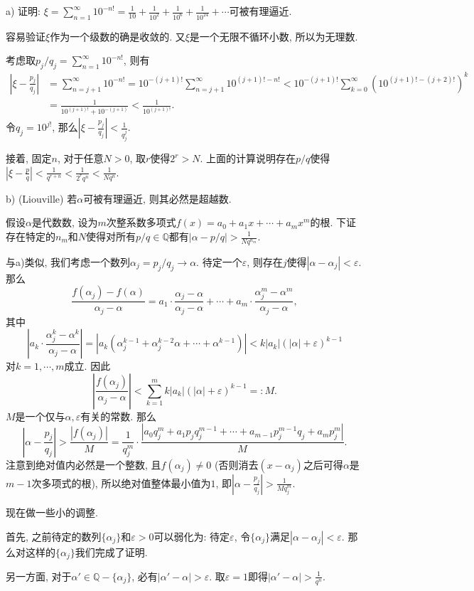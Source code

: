 a) 证明: $\xi = \sum_{n=1}^{\infty} 10^{-n!} = \frac{1}{10} + \frac{1}{10^2} + \frac{1}{10^6}+\frac{1}{10^{24}} + \cdots$可被有理逼近. 

\begin{solution}
	容易验证$\xi$作为一个级数的确是收敛的. 又$\xi$是一个无限不循环小数, 所以为无理数.
	
	考虑取$p_j/q_j = \sum_{n=1}^{\infty} 10^{-n!}$, 则有
	\begin{align*}
		\left| \xi - \frac{p_j}{q_j} \right| &= \sum_{n=j+1}^{\infty} 10^{-n!} = 10^{-(j+1)!} \sum_{n=j+1}^{\infty} 10^{(j+1)!-n!} < 10^{-(j+1)!} \sum_{k=0}^{\infty} \left( 10^{(j+1)!-(j+2)!} \right)^k \\
		&= \frac{1}{10^{(j+1)!} + 10^{-(j+1)}} < \frac{1}{10^{(j+1)!}}.
	\end{align*}
	令$q_j=10^{j!}$, 那么$|\xi - \frac{p_j}{q_j}| < \frac{1}{q_j^j}$. 
	
	接着, 固定$n$, 对于任意$N>0$, 取$r$使得$2^r>N$. 上面的计算说明存在$p/q$使得$|\xi - \frac{p}{q} |< \frac{1}{q^{r+n}} < \frac{1}{2^r q^n} < \frac{1}{Nq^n}$. 
\end{solution}

b) (Liouville) 若$\alpha$可被有理逼近, 则其必然是超越数. 

\begin{solution}
	假设$\alpha$是代数数, 设为$m$次整系数多项式$f(x) = a_0 + a_1x + \cdots + a_mx^m$的根. 下证存在特定的$n_m$和$N$使得对所有$p/q \in \mathbb{Q}$都有$|\alpha - p/q| > \frac{1}{Nq^{n_m}}$. 
	
	与a)类似, 我们考虑一个数列$\alpha _j = p_j/q_j \to \alpha$. 待定一个$\varepsilon$, 则存在$j$使得$|\alpha - \alpha _j |<\varepsilon$. 那么$$\frac{ f(\alpha _j)-f(\alpha) }{\alpha _j - \alpha}  = a_1 \cdot \frac{\alpha _j - \alpha}{\alpha _j - \alpha} + \cdots + a_m \cdot \frac{\alpha _j^m - \alpha ^m}{\alpha _j - \alpha}, $$
	其中$$\left| a_k \cdot \frac{\alpha _j^k - \alpha ^k}{\alpha _j - \alpha} \right| = |a_k(\alpha _j ^{k-1} + \alpha _j ^{k-2} \alpha + \cdots + \alpha ^{k-1})| < k|a_k|(|\alpha |+\varepsilon)^{k-1}$$
	对$k=1,\cdots ,m$成立. 因此$$\left| \frac{f(\alpha _j)}{\alpha _j - \alpha} \right| < \sum_{k=1}^{m} k|a_k|(|\alpha |+\varepsilon)^{k-1} =: M.$$
	$M$是一个仅与$\alpha ,\varepsilon$有关的常数. 那么$$\left|\alpha - \frac{p_j}{q_j}	\right| > \frac{|f(\alpha _j)|}{M} = \frac{1}{q_j^m} \cdot \frac{|a_0q_j^m + a_1p_jq_j^{m-1} + \cdots + a_{m-1}p_j^{m-1}q_j + a_mp_j^{m} |}{M}. $$
	注意到绝对值内必然是一个整数, 且$f(\alpha _j) \neq 0$ (否则消去$(x-\alpha _j)$之后可得$\alpha$是$m-1$次多项式的根), 所以绝对值整体最小值为$1$, 即$\left|\alpha - \frac{p_j}{q_j}	\right| > \frac{1}{Mq_j^m}$. 
	
	现在做一些小的调整. 
	
	首先, 之前待定的数列$\{ \alpha _j \}$和$\varepsilon >0$可以弱化为: 待定$\varepsilon$, 令$\{ \alpha _j \}$满足$|\alpha - \alpha _j |<\varepsilon$. 那么对这样的$\{ \alpha _j \}$我们完成了证明. 
	
	另一方面, 对于$\alpha ' \in \mathbb{Q} - \{ \alpha _j \}$, 必有$|\alpha ' - \alpha|>\varepsilon$. 取$\varepsilon = 1$即得$|\alpha ' - \alpha| > \frac{1}{q^n}$. 
\end{solution}

